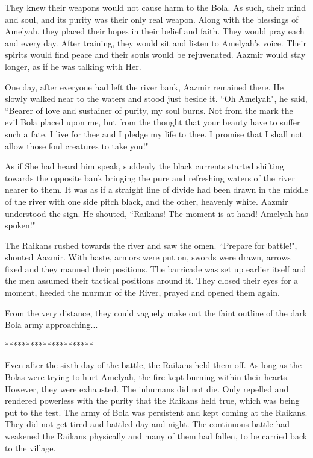 \documentclass[twoside,11pt,titlepage]{article}
\begin{document}
They knew their weapons would not cause harm to the Bola. As such, their mind and soul, and its purity was their only real weapon. Along with the blessings of Amelyah, they placed their hopes in their belief and faith. They would pray each and every day. After training, they would sit and listen to Amelyah's voice. Their spirits would find peace and their souls would be rejuvenated. Aazmir would stay longer, as if he was talking with Her.

One day, after everyone had left the river bank, Aazmir remained there. He slowly walked near to the waters and stood just beside it. ``Oh Amelyah", he said, ``Bearer of love and sustainer of purity, my soul burns. Not from the mark the evil Bola placed upon me, but from the thought that your beauty have to suffer such a fate. I live for thee and I pledge my life to thee. I promise that I shall not allow those foul creatures to take you!"

As if She had heard him speak, suddenly the black currents started shifting towards the opposite bank bringing the pure and refreshing waters of the river nearer to them. It was as if a straight line of divide had been drawn in the middle of the river with one side pitch black, and the other, heavenly white. Aazmir understood the sign. He shouted, ``Raikans! The moment is at hand! Amelyah has spoken!"

The Raikans rushed towards the river and saw the omen. ``Prepare for battle!", shouted Aazmir. With haste, armors were put on, swords were drawn, arrows fixed and they manned their positions. The barricade was set up earlier itself and the men assumed their tactical positions around it. They closed their eyes for a moment, heeded the murmur of the River, prayed and opened them again.

From the very distance, they could vaguely make out the faint outline of the dark Bola army approaching...

\bigskip
\begin{center}
*********************
\end{center}

Even after the sixth day of the battle, the Raikans held them off. As long as the Bolas were trying to hurt Amelyah, the fire kept burning within their hearts. However, they were exhausted. The inhumans did not die. Only repelled and rendered powerless with the purity that the Raikans held true, which was being put to the test. The army of Bola was persistent and kept coming at the Raikans. They did not get tired and battled day and night. The continuous battle had weakened the Raikans physically and many of them had fallen, to be carried back to the village.
\end{document}
